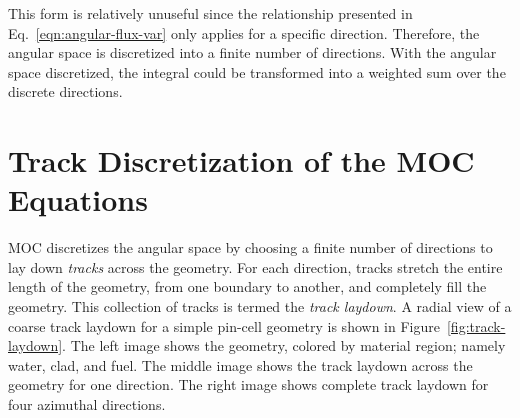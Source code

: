 This form is relatively unuseful since the relationship presented in Eq.~\ref{eqn:angular-flux-var} only applies for a specific direction. Therefore, the angular space is discretized into a finite number of directions. With the angular space discretized, the integral could be transformed into a weighted sum over the discrete directions.

\section{Track Discretization of the MOC Equations}

MOC discretizes the angular space by choosing a finite number of directions to lay down \textit{tracks} across the geometry. For each direction, tracks stretch the entire length of the geometry, from one boundary to another, and completely fill the geometry. This collection of tracks is termed the \textit{track laydown}. A radial view of a coarse track laydown for a simple pin-cell geometry is shown in Figure~\ref{fig:track-laydown}. The left image shows the geometry, colored by material region; namely water, clad, and fuel. The middle image shows the track laydown across the geometry for one direction. The right image shows complete track laydown for four azimuthal directions.

